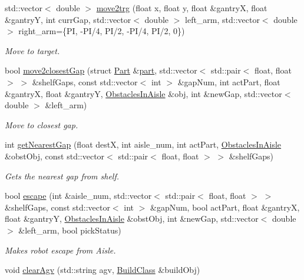 \begin{DoxyCompactItemize}
std\+::vector$<$ double $>$ \hyperlink{classGantryControl_a9f50d479e484a95c4a99d243571a3ae7}{move2trg} (float x, float y, float \&gantryX, float \&gantryY, int curr\+Gap, std\+::vector$<$ double $>$ left\+\_\+arm, std\+::vector$<$ double $>$ right\+\_\+arm=\{PI, -\/PI/4, PI/2, -\/PI/4, PI/2, 0\})
\begin{DoxyCompactList}\small\item\em Move to target. \end{DoxyCompactList}\item 
bool \hyperlink{classGantryControl_a9832fe95565f2b6663426b5568ab0a03}{move2closest\+Gap} (struct \hyperlink{structPart}{Part} \&\hyperlink{utils_8h_a67ee3a5b9091664130eca8efc8b97ab9}{part}, std\+::vector$<$ std\+::pair$<$ float, float $>$ $>$ \&shelf\+Gaps, const std\+::vector$<$ int $>$ \&gap\+Num, int act\+Part, float \&gantryX, float \&gantryY, \hyperlink{classObstaclesInAisle}{Obstacles\+In\+Aisle} \&obj, int \&new\+Gap, std\+::vector$<$ double $>$ \&left\+\_\+arm)
\begin{DoxyCompactList}\small\item\em Move to closest gap. \end{DoxyCompactList}\item 
int \hyperlink{classGantryControl_a8a2c57ab3052064c28d1149cee366733}{get\+Nearest\+Gap} (float destX, int aisle\+\_\+num, int act\+Part, \hyperlink{classObstaclesInAisle}{Obstacles\+In\+Aisle} \&obst\+Obj, const std\+::vector$<$ std\+::pair$<$ float, float $>$ $>$ \&shelf\+Gaps)
\begin{DoxyCompactList}\small\item\em Gets the nearest gap from shelf. \end{DoxyCompactList}\item 
bool \hyperlink{classGantryControl_aa014dd433af4fc580d38639c6353e7b8}{escape} (int \&aisle\+\_\+num, std\+::vector$<$ std\+::pair$<$ float, float $>$ $>$ \&shelf\+Gaps, const std\+::vector$<$ int $>$ \&gap\+Num, bool act\+Part, float \&gantryX, float \&gantryY, \hyperlink{classObstaclesInAisle}{Obstacles\+In\+Aisle} \&obst\+Obj, int \&new\+Gap, std\+::vector$<$ double $>$ \&left\+\_\+arm, bool pick\+Status)
\begin{DoxyCompactList}\small\item\em Makes robot escape from Aisle. \end{DoxyCompactList}\item 
void \hyperlink{classGantryControl_ad7df230473058728ad07804a3d6d1b4c}{clear\+Agv} (std\+::string agv, \hyperlink{classBuildClass}{Build\+Class} \&build\+Obj)

\end{DoxyCompactItemize}
